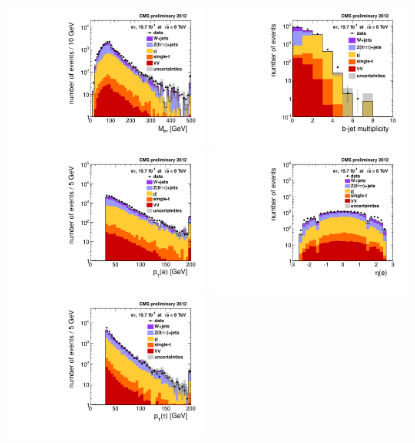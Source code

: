 \begin{figure}[hbtp]
  \begin{center}
    \includegraphics[width=0.465\textwidth]{figures/etau/etauMassMultJet.pdf}
    \includegraphics[width=0.465\textwidth]{figures/etau/nBJetMultJet.pdf} \\
    \includegraphics[width=0.465\textwidth]{figures/etau/elPtMultJet.pdf}
    \includegraphics[width=0.465\textwidth]{figures/etau/elEtaMultJet.pdf} \\
    \includegraphics[width=0.465\textwidth]{figures/etau/tauPtMultJet.pdf}

\end{center}
\end{figure}
